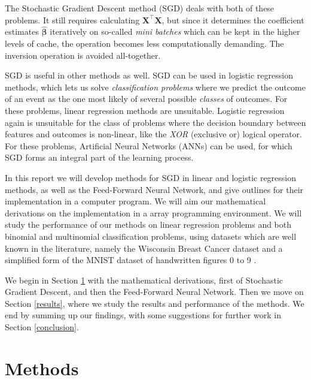 \documentclass[]{article}
\begin{document}
The Stochastic Gradient Descent method (SGD) deals with both of these problems. It still requires calculating $\mathbf{X}^\intercal \mathbf{X}$, but since it determines the coefficient estimates $\mathbf{\hat{\beta}}$ iteratively on so-called \textit{mini batches} which can be kept in the higher levels of cache, the operation becomes less computationally demanding. The inversion operation is avoided all-together. 

SGD is useful in other methods as well. SGD can be used in logistic regression methods, which lets us solve \textit{classification problems} where we predict the outcome of an event as the one most likely of several possible \textit{classes} of outcomes. For these problems, linear regression methods are unsuitable. Logistic regression again is unsuitable for the class of problems where the decision boundary between features and outcomes is non-linear, like the \textit{XOR} (exclusive or) logical operator. For these problems, Artificial Neural Networks (ANNs) can be used, for which SGD forms an integral part of the learning process.

In this report we will develop methods for SGD in linear and logistic regression methods, as well as the Feed-Forward Neural Network, and give outlines for their implementation in a computer program. We will aim our mathematical derivations on the implementation in a array programming environment. We will study the performance of our methods on linear regression problems and both binomial and multinomial classification problems, using datasets which are well known in the literature, namely the Wisconsin Breast Cancer dataset and a simplified form of the MNIST dataset of handwritten figures 0 to 9 \cite{skl-datasets}.

We begin in Section \ref{methods} with the mathematical derivations, first of Stochastic Gradient Descent, and then the Feed-Forward Neural Network. Then we move on Section \ref{results}, where we study the results and performance of the methods. We end by summing up our findings, with some suggestions for further work in Section \ref{conclusion}.


\section{Methods} \label{methods}
\end{document}
